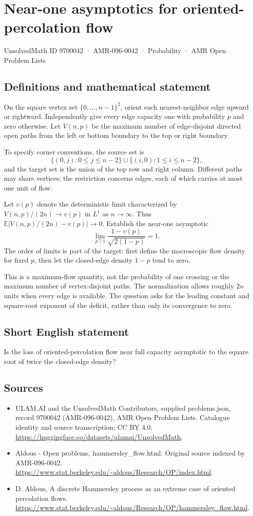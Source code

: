 \documentclass[11pt,a4paper]{article}
\begin{document}
\section*{Near-one asymptotics for oriented-percolation flow}\label{9700042}
{\small UnsolvedMath ID 9700042 · AMR-096-0042 · Probability · AMR Open Problem Lists}
\subsection{Definitions and mathematical statement}
On the square vertex set $\{0,\ldots,n-1\}^2$, orient each nearest-neighbor edge upward or rightward. Independently give every edge capacity one with probability $p$ and zero otherwise. Let $V(n,p)$ be the maximum number of edge-disjoint directed open paths from the left or bottom boundary to the top or right boundary.

To specify corner conventions, the source set is
\[
\{(0,j):0\le j\le n-2\}\cup\{(i,0):1\le i\le n-2\},
\]
and the target set is the union of the top row and right column. Different paths may share vertices; the restriction concerns edges, each of which carries at most one unit of flow.

Let $v(p)$ denote the deterministic limit characterized by $V(n,p)/(2n)\to v(p)$ in $L^1$ as $n\to\infty$. Thus $\mathbb E|V(n,p)/(2n)-v(p)|\to0$. Establish the near-one asymptotic
\[
\lim_{p\uparrow1}\frac{1-v(p)}{\sqrt{2(1-p)}}=1.
\]
The order of limits is part of the target: first define the macroscopic flow density for fixed $p$, then let the closed-edge density $1-p$ tend to zero.

This is a maximum-flow quantity, not the probability of one crossing or the maximum number of vertex-disjoint paths. The normalization allows roughly $2n$ units when every edge is available. The question asks for the leading constant and square-root exponent of the deficit, rather than only its convergence to zero.
\subsection{Short English statement}
Is the loss of oriented-percolation flow near full capacity asymptotic to the square root of twice the closed-edge density?
\subsection{Sources}
\begin{itemize}
\item[S1] ULAM.AI and the UnsolvedMath Contributors, supplied problems.json, record 9700042 (AMR-096-0042), AMR Open Problem Lists. Catalogue identity and source transcription; CC BY 4.0.
\url{https://huggingface.co/datasets/ulamai/UnsolvedMath}.
\item[S2] Aldous - Open problems, hammersley\_flow.html. Original source indexed by AMR-096-0042.
\url{https://www.stat.berkeley.edu/~aldous/Research/OP/index.html}.
\item[S3] D. Aldous, A discrete Hammersley process as an extreme case of oriented percolation flows.
\url{https://www.stat.berkeley.edu/~aldous/Research/OP/hammersley_flow.html}.
\end{itemize}
\end{document}
